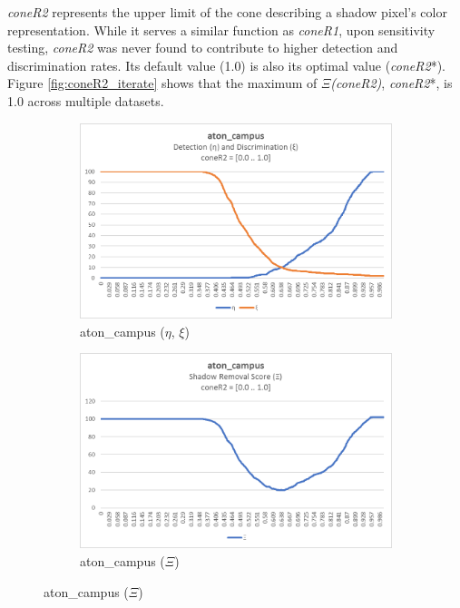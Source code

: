 \FloatBarrier
\textit{coneR2} represents the upper limit of the cone describing a shadow pixel's color representation. While it serves a similar function as \textit{coneR1}, upon sensitivity testing, \textit{coneR2} was never found to contribute to higher detection and discrimination rates. Its default value (1.0) is also its optimal value (\textit{coneR2}*). Figure \ref{fig:coneR2_iterate} shows that the maximum of $\Xi$\textit{(coneR2)}, \textit{coneR2}*, is 1.0 across multiple datasets.

\begin{figure}
  \begin{subfigure}{.45\linewidth}
  \includegraphics[width=1\linewidth]{figures/campus_coneR2_response.jpg}
  \caption{aton\_campus ($\eta$, $\xi$)}
\end{subfigure}
\hfill
\begin{subfigure}{.45\linewidth}
  \includegraphics[width=1\linewidth]{figures/campus_coneR2_score.jpg}
  \caption{aton\_campus ($\Xi$)}

\end{subfigure}
\end{figure}
